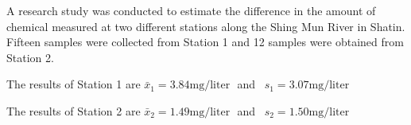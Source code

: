 \documentclass[letterpaper,10pt,addpoints]{exam}
\begin{document}
\begin{questions}



\question[45]
A research study was conducted to estimate the difference in the amount of chemical measured at two different stations along the Shing Mun River in Shatin. Fifteen samples were collected from Station 1 and 12 samples were obtained from Station 2.

The results of Station 1 are $\bar{x}_1=3.84 \mathrm{mg} / \text {liter }$ and ~$s_1=3.07 \mathrm{mg} / \text {liter} $

The results of Station 2 are $\bar{x}_2=1.49 \mathrm{mg} / \text {liter }$ and ~$s_2=1.50 \mathrm{mg} / \mathrm{liter}$
\end{questions}
\end{document}

